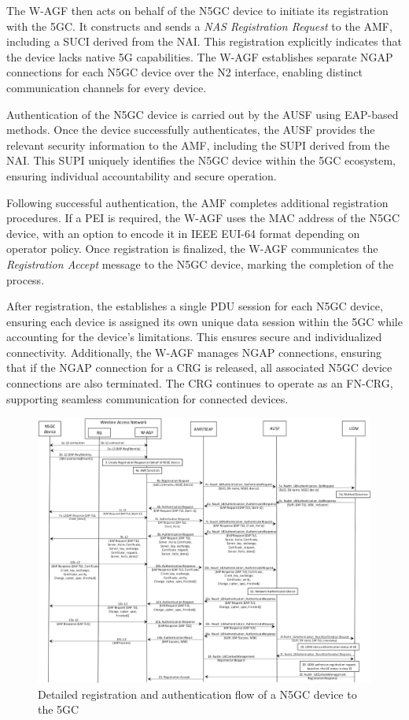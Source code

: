 The \ac{W-AGF} then acts on behalf of the \ac{N5GC} device to initiate its registration with the \ac{5GC}. It constructs and sends a \textit{\ac{NAS} Registration Request} to the \ac{AMF}, including a \ac{SUCI} derived from the \ac{NAI}. This registration explicitly indicates that the device lacks native \ac{5G} capabilities. The \ac{W-AGF} establishes separate \ac{NGAP} connections for each \ac{N5GC} device over the N2 interface, enabling distinct communication channels for every device.

Authentication of the \ac{N5GC} device is carried out by the \ac{AUSF} using \ac{EAP}-based methods. Once the device successfully authenticates, the \ac{AUSF} provides the relevant security information to the \ac{AMF}, including the \ac{SUPI} derived from the \ac{NAI}. This \ac{SUPI} uniquely identifies the \ac{N5GC} device within the \ac{5GC} ecosystem, ensuring individual accountability and secure operation.

Following successful authentication, the \ac{AMF} completes additional registration procedures. If a \ac{PEI} is required, the \ac{W-AGF} uses the \ac{MAC} address of the \ac{N5GC} device, with an option to encode it in IEEE \ac{EUI-64} format depending on operator policy. Once registration is finalized, the \ac{W-AGF} communicates the \textit{Registration Accept} message to the \ac{N5GC} device, marking the completion of the process.

After registration, the  establishes a single \ac{PDU} session for each \ac{N5GC} device, ensuring each device is assigned its own unique data session within the \ac{5GC} while accounting for the device's limitations. This ensures secure and individualized connectivity. Additionally, the \ac{W-AGF} manages \ac{NGAP} connections, ensuring that if the \ac{NGAP} connection for a \ac{CRG} is released, all associated \ac{N5GC} device connections are also terminated. The \ac{CRG} continues to operate as an \ac{FN-CRG}, supporting seamless communication for connected devices.

\begin{figure}
    \centering
    \includegraphics[width=0.75\linewidth]{figs/Detailed registration and authentication flow of a non-5G capable device to the 5GC.png}
    \caption{Detailed registration and authentication flow of a \ac{N5GC} device to the \ac{5GC}}
    \label{fig:Detailed registration and authentication flow of a non-5G capable device to the 5GC}
\end{figure}

